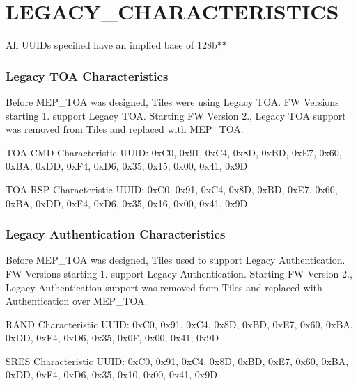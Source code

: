 \hypertarget{group___l_e_g_a_c_y___c_h_a_r_a_c_t_e_r_i_s_t_i_c_s}{}\section{L\+E\+G\+A\+C\+Y\+\_\+\+C\+H\+A\+R\+A\+C\+T\+E\+R\+I\+S\+T\+I\+CS}
\label{group___l_e_g_a_c_y___c_h_a_r_a_c_t_e_r_i_s_t_i_c_s}
All U\+U\+I\+Ds specified have an implied base of 128b$\ast$$\ast$

\subsubsection*{Legacy T\+OA Characteristics}

Before M\+E\+P\+\_\+\+T\+OA was designed, Tiles were using Legacy T\+OA. FW Versions starting 1. support Legacy T\+OA. Starting FW Version 2., Legacy T\+OA support was removed from Tiles and replaced with M\+E\+P\+\_\+\+T\+OA.


\begin{DoxyItemize}
\item T\+OA C\+MD Characteristic U\+U\+ID\+: 0x\+C0, 0x91, 0x\+C4, 0x8D, 0x\+BD, 0x\+E7, 0x60, 0x\+BA, 0x\+DD, 0x\+F4, 0x\+D6, 0x35, 0x15, 0x00, 0x41, 0x9D
\item T\+OA R\+SP Characteristic U\+U\+ID\+: 0x\+C0, 0x91, 0x\+C4, 0x8D, 0x\+BD, 0x\+E7, 0x60, 0x\+BA, 0x\+DD, 0x\+F4, 0x\+D6, 0x35, 0x16, 0x00, 0x41, 0x9D
\end{DoxyItemize}

\subsubsection*{Legacy Authentication Characteristics}

Before M\+E\+P\+\_\+\+T\+OA was designed, Tiles used to support Legacy Authentication. FW Versions starting 1. support Legacy Authentication. Starting FW Version 2., Legacy Authentication support was removed from Tiles and replaced with Authentication over M\+E\+P\+\_\+\+T\+OA.


\begin{DoxyItemize}
\item R\+A\+ND Characteristic U\+U\+ID\+: 0x\+C0, 0x91, 0x\+C4, 0x8D, 0x\+BD, 0x\+E7, 0x60, 0x\+BA, 0x\+DD, 0x\+F4, 0x\+D6, 0x35, 0x0F, 0x00, 0x41, 0x9D
\item S\+R\+ES Characteristic U\+U\+ID\+: 0x\+C0, 0x91, 0x\+C4, 0x8D, 0x\+BD, 0x\+E7, 0x60, 0x\+BA, 0x\+DD, 0x\+F4, 0x\+D6, 0x35, 0x10, 0x00, 0x41, 0x9D
\end{DoxyItemize}

